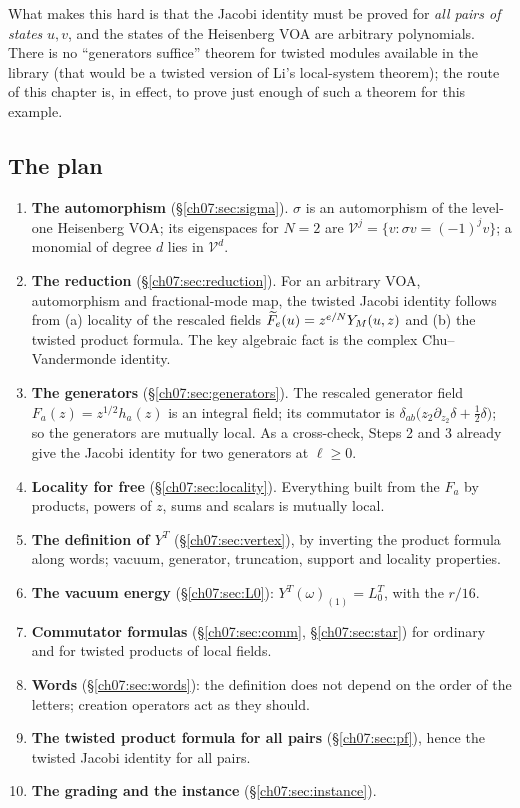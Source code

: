 What makes this hard is that the Jacobi identity must be proved for \emph{all pairs of states}
$u, v$, and the states of the Heisenberg VOA are arbitrary polynomials. There is no ``generators
suffice'' theorem for twisted modules available in the library (that would be a twisted version
of Li's local-system theorem); the route of this chapter is, in effect, to prove just enough of
such a theorem for this example.

\subsection{The plan}\label{ch07:sec:plan}

\begin{enumerate}[label=\textbf{Step \arabic*.},leftmargin=*]
  \item \textbf{The automorphism} (\S\ref{ch07:sec:sigma}). $\sigma$ is an automorphism of the
  level-one Heisenberg VOA; its eigenspaces for $N=2$ are $\mathcal V^j = \{v : \sigma v =
  (-1)^j v\}$; a monomial of degree $d$ lies in $\mathcal V^d$.
  \item \textbf{The reduction} (\S\ref{ch07:sec:reduction}). For an arbitrary VOA, automorphism
  and fractional-mode map, the twisted Jacobi identity follows from (a) locality of the rescaled
  fields $\widetilde{F}_e(u) = z^{e/N}Y_M(u,z)$ and (b) the twisted product formula. The key
  algebraic fact is the complex Chu--Vandermonde identity.
  \item \textbf{The generators} (\S\ref{ch07:sec:generators}). The rescaled generator field
  $F_a(z) = z^{1/2}h_a(z)$ is an integral field; its commutator is
  $\delta_{ab}\bigl(z_2\partial_{z_2}\delta + \tfrac12\delta\bigr)$; so the generators are mutually
  local. As a cross-check, Steps 2 and 3 already give the Jacobi identity for two generators at
  $\ell\ge 0$.
  \item \textbf{Locality for free} (\S\ref{ch07:sec:locality}). Everything built from the $F_a$
  by products, powers of $z$, sums and scalars is mutually local.
  \item \textbf{The definition of $Y^T$} (\S\ref{ch07:sec:vertex}), by inverting the product
  formula along words; vacuum, generator, truncation, support and locality properties.
  \item \textbf{The vacuum energy} (\S\ref{ch07:sec:L0}): $Y^T(\omega)_{(1)} = L_0^T$, with
  the $r/16$.
  \item \textbf{Commutator formulas} (\S\ref{ch07:sec:comm}, \S\ref{ch07:sec:star}) for ordinary
  and for twisted products of local fields.
  \item \textbf{Words} (\S\ref{ch07:sec:words}): the definition does not depend on the order of
  the letters; creation operators act as they should.
  \item \textbf{The twisted product formula for all pairs} (\S\ref{ch07:sec:pf}), hence the
  twisted Jacobi identity for all pairs.
  \item \textbf{The grading and the instance} (\S\ref{ch07:sec:instance}).
\end{enumerate}

